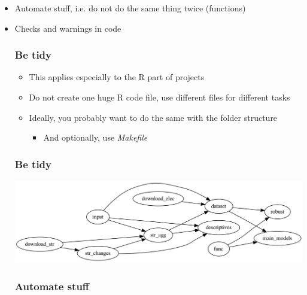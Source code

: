 \documentclass[utf8, xcolor=dvipsnames, handout]{beamer}
\begin{document}
\begin{itemize}
  \item Automate stuff, i.e. do not do the same thing twice (functions)
  \item Checks and warnings in code





\begin{frame}
\frametitle{Be tidy}
\centering

\begin{itemize}
  \item This applies especially to the R part of projects
  \item Do not create one huge R code file, use different files for different tasks
  \item Ideally, you probably want to do the same with the folder structure
  \begin{itemize}
    \item And optionally, use \textit{Makefile}
  \end{itemize}
\end{itemize}

\end{frame}

\begin{frame}
\frametitle{Be tidy}
\centering

\includegraphics[width = \textwidth]{img/workflow_vox_streets}

\end{frame}

\begin{frame}
\frametitle{Automate stuff}
\centering


\end{frame}
\end{itemize}
\end{document}
